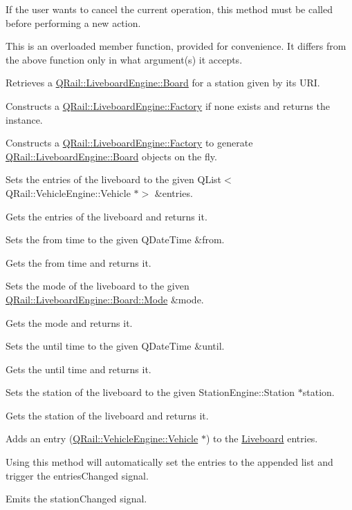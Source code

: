 If the user wants to cancel the current operation, this method must be called before performing a new action.

This is an overloaded member function, provided for convenience. It differs from the above function only in what argument(s) it accepts.

Retrieves a \mbox{\hyperlink{classQRail_1_1LiveboardEngine_1_1Board}{Q\+Rail\+::\+Liveboard\+Engine\+::\+Board}} for a station given by it\textquotesingle{}s U\+RI.

Constructs a \mbox{\hyperlink{classQRail_1_1LiveboardEngine_1_1Factory}{Q\+Rail\+::\+Liveboard\+Engine\+::\+Factory}} if none exists and returns the instance.

Constructs a \mbox{\hyperlink{classQRail_1_1LiveboardEngine_1_1Factory}{Q\+Rail\+::\+Liveboard\+Engine\+::\+Factory}} to generate \mbox{\hyperlink{classQRail_1_1LiveboardEngine_1_1Board}{Q\+Rail\+::\+Liveboard\+Engine\+::\+Board}} objects on the fly.

Sets the entries of the liveboard to the given Q\+List$<$\+Q\+Rail\+::\+Vehicle\+Engine\+::\+Vehicle $\ast$$>$ \&entries.

Gets the entries of the liveboard and returns it.

Sets the from time to the given Q\+Date\+Time \&from.

Gets the from time and returns it.

Sets the mode of the liveboard to the given \mbox{\hyperlink{classQRail_1_1LiveboardEngine_1_1Board_a0ab6d318f405895f62c6e98cb2d86c6e}{Q\+Rail\+::\+Liveboard\+Engine\+::\+Board\+::\+Mode}} \&mode.

Gets the mode and returns it.

Sets the until time to the given Q\+Date\+Time \&until.

Gets the until time and returns it.

Sets the station of the liveboard to the given Station\+Engine\+::\+Station $\ast$station.

Gets the station of the liveboard and returns it.

Adds an entry (\mbox{\hyperlink{classQRail_1_1VehicleEngine_1_1Vehicle}{Q\+Rail\+::\+Vehicle\+Engine\+::\+Vehicle}} $\ast$) to the \mbox{\hyperlink{namespaceLiveboard}{Liveboard}} entries.

Using this method will automatically set the entries to the appended list and trigger the entries\+Changed signal.

Emits the station\+Changed signal.

